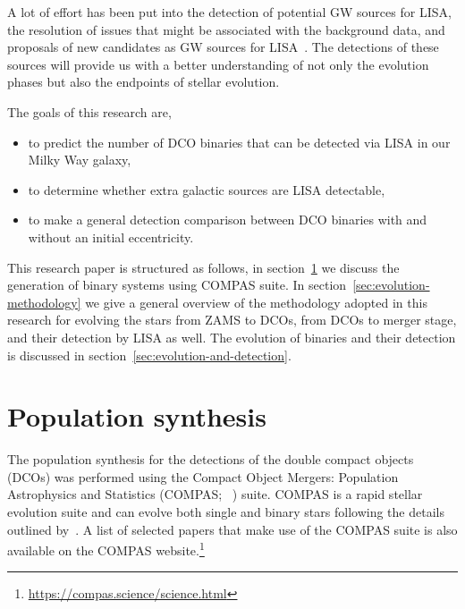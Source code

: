 \documentclass[journal, twocolumn]{IEEEtran}
\begin{document}
    A lot of effort has been put into the detection of potential GW sources for LISA, the resolution of issues that might be associated with the background data, and proposals of new candidates as GW sources for LISA~\cite[see, for example,][]{Lau2020, Sesana2009, Khakhaleva2020, Renzo2021, Fumagalli2022, wagg2021gravitational, Broekgaarden2021, Shao2021, Andrews2020, Belczynski2010, Guo2017, Babak2010, Blaut2010, Babak2008, Ruiter2010, Nelemans2001, Yu2010}.
    The detections of these sources will provide us with a better understanding of not only the evolution phases but also the endpoints of stellar evolution.

    The goals of this research are,
    \begin{itemize}%
        \item to predict the number of DCO binaries that can be detected via LISA in our Milky Way galaxy,
        \item to determine whether extra galactic sources are LISA detectable,
        \item to make a general detection comparison between DCO binaries with and without an initial eccentricity.
    \end{itemize}%

    This research paper is structured as follows, in section~\ref{sec:population_synthesis} we discuss the generation of binary systems using COMPAS suite.
    In section~\ref{sec:evolution-methodology} we give a general overview of the methodology adopted in this research for evolving the stars from ZAMS to DCOs, from DCOs to merger stage, and their detection by LISA as well.
    The evolution of binaries and their detection is discussed in section~\ref{sec:evolution-and-detection}.


    \section{Population synthesis}
    \label{sec:population_synthesis}
    The population synthesis for the detections of the double compact objects (DCOs) was performed using the Compact Object Mergers: Population Astrophysics and Statistics (COMPAS; ~\cite{stevenson2017formation, Riley2022, Vigna2018}) suite.
    COMPAS is a rapid stellar evolution suite and can evolve both single and binary stars following the details outlined by~\cite{Hurley2000, Hurley2002}.
    A list of selected papers that make use of the COMPAS suite is also available on the COMPAS website.\footnote{\url{https://compas.science/science.html}}
\end{document}
